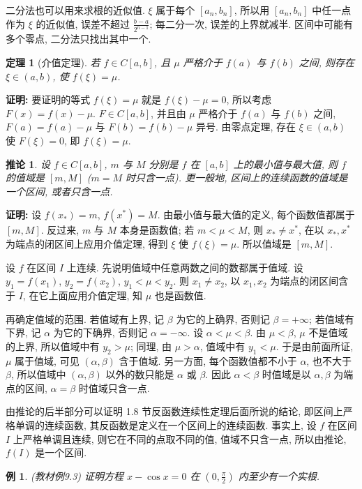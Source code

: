 \documentclass[UTF8,openany]{ctexbook}
\theoremstyle{chinesetextbook}
\newtheorem{example}{例}[section]
\newtheorem{theorem}{定理}[section]
\newenvironment{cnproof}{\par\indent\textbf{证明:} \ignorespaces}{\par}
\newtheorem*{corollarysingle}{推论}
\begin{document}
二分法也可以用来求根的近似值. $\xi$ 属于每个 $[a_n,b_n]$, 所以用 $[a_n,b_n]$ 中任一点作为 $\xi$ 的近似值, 误差不超过 $\displaystyle\frac{b-a}{2^{n-1}}$; 每二分一次, 误差的上界就减半. 区间中可能有多个零点, 二分法只找出其中一个.
\begin{theorem}[介值定理]
若 $f\in C[a,b]$, 且 $\mu$ 严格介于 $f(a)$ 与 $f(b)$ 之间, 则存在 $\xi\in(a,b)$, 使 $f(\xi)=\mu$.
\end{theorem}
\begin{cnproof}
要证明的等式 $f(\xi)=\mu$ 就是 $f(\xi)-\mu=0$, 所以考虑 $F(x)=f(x)-\mu$. $F\in C[a,b]$, 并且由 $\mu$ 严格介于 $f(a)$ 与 $f(b)$ 之间, $F(a)=f(a)-\mu$ 与 $F(b)=f(b)-\mu$ 异号. 由零点定理, 存在 $\xi\in(a,b)$ 使 $F(\xi)=0$, 即 $f(\xi)=\mu$.
\end{cnproof}
\begin{corollarysingle}
设 $f\in C[a,b]$, $m$ 与 $M$ 分别是 $f$ 在 $[a,b]$ 上的最小值与最大值, 则 $f$ 的值域是 $[m,M]$ ($m=M$ 时只含一点). 更一般地, 区间上的连续函数的值域是一个区间, 或者只含一点.
\end{corollarysingle}
\begin{cnproof}
设 $f(x_*)=m$, $f(x^*)=M$. 由最小值与最大值的定义, 每个函数值都属于 $[m,M]$. 反过来, $m$ 与 $M$ 本身是函数值; 若 $m<\mu<M$, 则 $x_*\ne x^*$, 在以 $x_*,x^*$ 为端点的闭区间上应用介值定理, 得到 $\xi$ 使 $f(\xi)=\mu$. 所以值域是 $[m,M]$.

设 $f$ 在区间 $I$ 上连续. 先说明值域中任意两数之间的数都属于值域. 设 $y_1=f(x_1)$, $y_2=f(x_2)$, $y_1<\mu<y_2$. 则 $x_1\ne x_2$, 以 $x_1,x_2$ 为端点的闭区间含于 $I$, 在它上面应用介值定理, 知 $\mu$ 也是函数值.

再确定值域的范围. 若值域有上界, 记 $\beta$ 为它的上确界, 否则记 $\beta=+\infty$; 若值域有下界, 记 $\alpha$ 为它的下确界, 否则记 $\alpha=-\infty$. 设 $\alpha<\mu<\beta$. 由 $\mu<\beta$, $\mu$ 不是值域的上界, 所以值域中有 $y_2>\mu$; 同理, 由 $\mu>\alpha$, 值域中有 $y_1<\mu$. 于是由前面所证, $\mu$ 属于值域, 可见 $(\alpha,\beta)$ 含于值域. 另一方面, 每个函数值都不小于 $\alpha$, 也不大于 $\beta$, 所以值域中 $(\alpha,\beta)$ 以外的数只能是 $\alpha$ 或 $\beta$. 因此 $\alpha<\beta$ 时值域是以 $\alpha,\beta$ 为端点的区间, $\alpha=\beta$ 时值域只含一点.
\end{cnproof}
由推论的后半部分可以证明 1.8 节反函数连续性定理后面所说的结论, 即区间上严格单调的连续函数, 其反函数是定义在一个区间上的连续函数. 事实上, 设 $f$ 在区间 $I$ 上严格单调且连续, 则它在不同的点取不同的值, 值域不只含一点, 所以由推论, $f(I)$ 是一个区间.
\begin{example}
\textnormal{(教材例9.3)} 证明方程 $x-\cos x=0$ 在 $\displaystyle\left(0,\frac\pi2\right)$ 内至少有一个实根.
\end{example}
\end{document}
